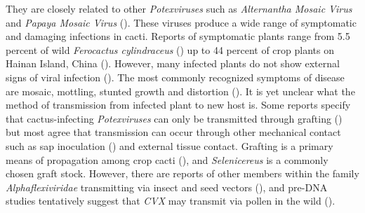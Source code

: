 \documentclass[11pt,letterpaper,titlepage]{article}
\begin{document}
\begin{linenumbers}
They are closely related to other \textit{Potexviruses} such as \textit{Alternantha Mosaic Virus} and \textit{Papaya Mosaic Virus} (\cite{martelli_family_2007, park_detection_2018, liou_complete_2004}). 
These viruses produce a wide range of symptomatic and damaging infections in cacti. 
Reports of symptomatic plants range from 5.5 percent of wild \textit{Ferocactus cylindraceus} (\cite{attathom_occurrence_1978}) up to 44 percent of crop plants on Hainan Island, China (\cite{peng_molecular_2016}). 
However, many infected plants do not show external signs of viral infection (\cite{liou_complete_2004, bos_symptoms_1977}). 
The most commonly recognized symptoms of disease are mosaic, mottling, stunted growth and distortion (\cite{maliarenko_cactus_2013, peng_molecular_2016, attathom_occurrence_1978}). 
It is yet unclear what the method of transmission from infected plant to new host is. 
Some reports specify that cactus-infecting \textit{Potexviruses} can only be transmitted through grafting (\cite{duarte_Potexvirus_2008, martelli_family_2007}) but most agree that transmission can occur through other mechanical contact such as sap inoculation (\cite{liou_complete_2004, maliarenko_cactus_2013, park_detection_2018}) and external tissue contact. 
Grafting is a primary means of propagation among crop cacti (\cite{park_detection_2018}), and \textit{Selenicereus} is a commonly chosen graft stock. 
However, there are reports of other members within the family \textit{Alphaflexiviridae} transmitting via insect and seed vectors (\cite{martelli_family_2007}), and pre-DNA studies tentatively suggest that \textit{CVX} may transmit via pollen in the wild (\cite{attathom_occurrence_1978}).


\end{linenumbers}
\end{document}
